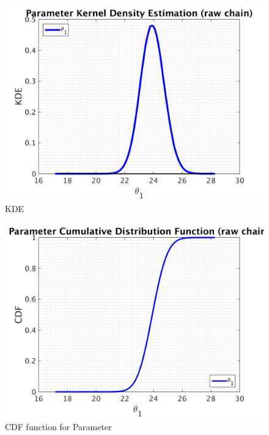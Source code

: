 \begin{figure}[H]
  
  \centering
   \includegraphics[scale=0.75]{100_results/outputData_900000/simple_ip_kde_raw}
   \caption{ KDE }
\end{figure}

\begin{figure}[H]
  
  \centering
   \includegraphics[scale=0.75]{100_results/outputData_900000/simple_ip_cdf_raw}
   \caption{CDF function for Parameter }
\end{figure}



